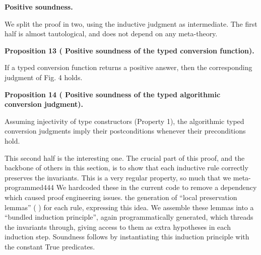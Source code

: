 \par\medskip\noindent\textbf{Positive soundness.}\par
 
 
We split the proof in two, using the inductive judgment as intermediate. The first half is almost tautological, and does not depend on any meta-theory.\par
 
 
 
\par\medskip\noindent\textbf{Proposition 13 (  Positive soundness of the typed conversion function).}\par
 
 
If a typed conversion function returns a positive answer, then the corresponding judgment of Fig. 4 holds.\par
 
 
 
 
\par\medskip\noindent\textbf{Proposition 14 (  Positive soundness of the typed algorithmic conversion judgment).}\par
 
 
Assuming injectivity of type constructors (Property 1), the algorithmic typed conversion judgments imply their postconditions whenever their preconditions hold.\par
 
 
 
 
This second half is the interesting one. The crucial part of this proof, and the backbone of others in this section, is to show that each inductive rule correctly preserves the invariants. This is a very regular property, so much that we meta-programmed444 We hardcoded these in the current code to remove a dependency which caused proof engineering issues.  the generation of “local preservation lemmas” ( ) for each rule, expressing this idea. We assemble these lemmas into a “bundled induction principle”, again programmatically generated, which threads the invariants through, giving access to them as extra hypotheses in each induction step. Soundness follows by instantiating this induction principle with the constant True predicates.\par
 
